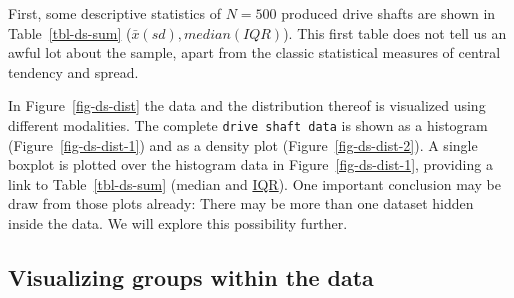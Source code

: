 \documentclass[
  a4paper,
]{scrbook}
\begin{document}
First, some descriptive statistics of \(N=500\) produced drive shafts
are shown in Table~\ref{tbl-ds-sum} (\(\bar{x}(sd), median(IQR)\)). This
first table does not tell us an awful lot about the sample, apart from
the classic statistical measures of central tendency and spread.

\begin{table}

\caption{\label{tbl-ds-sum}The summary table of the drive shaft data}


\end{table}%

In Figure~\ref{fig-ds-dist} the data and the distribution thereof is
visualized using different modalities. The complete
\texttt{drive\ shaft\ data} is shown as a histogram
(Figure~\ref{fig-ds-dist-1}) and as a density plot
(Figure~\ref{fig-ds-dist-2}). A single boxplot is plotted over the
histogram data in Figure~\ref{fig-ds-dist-1}, providing a link to
Table~\ref{tbl-ds-sum} (median and \hyperref[acronyms_IQR]{IQR}). One
important conclusion may be draw from those plots already: There may be
more than one dataset hidden inside the data. We will explore this
possibility further.

\subsection{Visualizing groups within the
data}\label{visualizing-groups-within-the-data}
\end{document}
